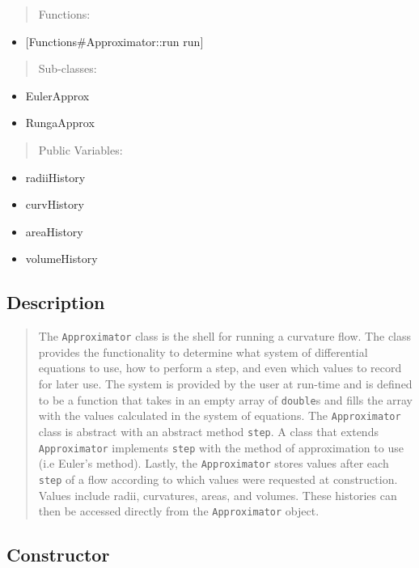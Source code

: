\documentclass[10pt]{article}%
\begin{document}
\begin{quotation} Functions:\end{quotation}
\begin{itemize}
\item  \mbox{$[$}Functions\#Approximator::run run\mbox{$]$}
\end{itemize}
\begin{quotation} Sub-classes:\end{quotation}
\begin{itemize}
\item  EulerApprox
\item  RungaApprox
\end{itemize}
\begin{quotation} Public Variables:\end{quotation}
\begin{itemize}
\item  radiiHistory
\item  curvHistory
\item  areaHistory
\item  volumeHistory
\end{itemize}

\subsection*{Description}

\begin{quotation} The \texttt{Approximator} class is the shell for running a curvature flow. The class provides the functionality to determine what system of differential equations to use, how to perform a step, and even which values to record for later use. The system is provided by the user at run-time and is defined to be a function that takes in an empty array of \texttt{double}s and fills the array with the values calculated in the system of equations. The \texttt{Approximator} class is abstract with an abstract method \texttt{step}. A class that extends \texttt{Approximator} implements \texttt{step} with the method of approximation to use (i.e Euler's method). Lastly, the \texttt{Approximator} stores values after each \texttt{step} of a flow according to which values were requested at construction. Values include radii, curvatures, areas, and volumes. These histories can then be accessed directly from the \texttt{Approximator} object.\end{quotation}

\subsection*{Constructor}
\end{document}
